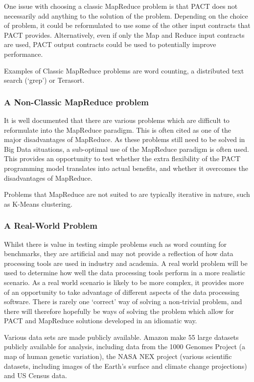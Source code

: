 One issue with choosing a classic MapReduce problem is that PACT does not necessarily add anything to the solution of the problem. Depending on the choice of problem, it could be reformulated to use some of the other input contracts that PACT provides. Alternatively, even if only the Map and Reduce input contracts are used, PACT output contracts could be used to potentially improve performance.

Examples of Classic MapReduce problems are word counting, a distributed text search (`grep') or Terasort.

\subsubsection{A Non-Classic MapReduce problem}
It is well documented that there are various problems which are difficult to reformulate into the MapReduce paradigm. This is often cited as one of the major disadvantages of MapReduce. As these problems still need to be solved in Big Data situations, a sub-optimal use of the MapReduce paradigm is often used. This provides an opportunity to test whether the extra flexibility of the PACT programming model translates into actual benefits, and whether it overcomes the disadvantages of MapReduce. 

Problems that MapReduce are not suited to are typically iterative in nature, such as K-Means clustering.  

\subsubsection{A Real-World Problem}
Whilst there is value in testing simple problems such as word counting for benchmarks, they are artificial and may not provide a reflection of how data processing tools are used in industry and academia. A real world problem will be used to determine how well the data processing tools perform in a more realistic scenario. As a real world scenario is likely to be more complex, it provides more of an opportunity to take advantage of different aspects of the data processing software. There is rarely one `correct' way of solving a non-trivial problem, and there will therefore hopefully be ways of solving the problem which allow for PACT and MapReduce solutions developed in an idiomatic way. 

Various data sets are made publicly available. Amazon make 55 large datasets publicly available for analysis, including data from the 1000 Genomes Project (a map of human genetic variation), the NASA NEX project (various scientific datasets, including images of the Earth's surface and climate change projections) and US Census data.

